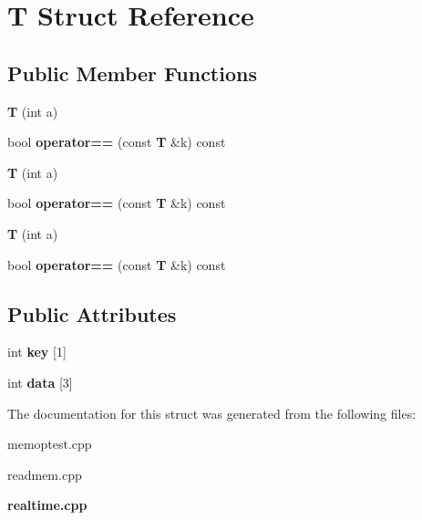 \section{T Struct Reference}
\label{structT}
\subsection*{Public Member Functions}
\begin{DoxyCompactItemize}
\item 
\mbox{\label{structT_a8f5edc9a39e3241d33ae54a5029b0043}} 
{\bfseries T} (int a)
\item 
\mbox{\label{structT_a548f7076ea10db21bc73979dd9735f47}} 
bool {\bfseries operator==} (const \textbf{ T} \&k) const
\item 
\mbox{\label{structT_a8f5edc9a39e3241d33ae54a5029b0043}} 
{\bfseries T} (int a)
\item 
\mbox{\label{structT_a548f7076ea10db21bc73979dd9735f47}} 
bool {\bfseries operator==} (const \textbf{ T} \&k) const
\item 
\mbox{\label{structT_a8f5edc9a39e3241d33ae54a5029b0043}} 
{\bfseries T} (int a)
\item 
\mbox{\label{structT_a548f7076ea10db21bc73979dd9735f47}} 
bool {\bfseries operator==} (const \textbf{ T} \&k) const
\end{DoxyCompactItemize}
\subsection*{Public Attributes}
\begin{DoxyCompactItemize}
\item 
\mbox{\label{structT_a910785bad87bed60eccfe8fec17e55ec}} 
int {\bfseries key} [1]
\item 
\mbox{\label{structT_a07547b3bcc7ade309011aaa5a56ec814}} 
int {\bfseries data} [3]
\end{DoxyCompactItemize}


The documentation for this struct was generated from the following files\+:\begin{DoxyCompactItemize}
\item 
memoptest.\+cpp\item 
readmem.\+cpp\item 
\textbf{ realtime.\+cpp}\end{DoxyCompactItemize}
